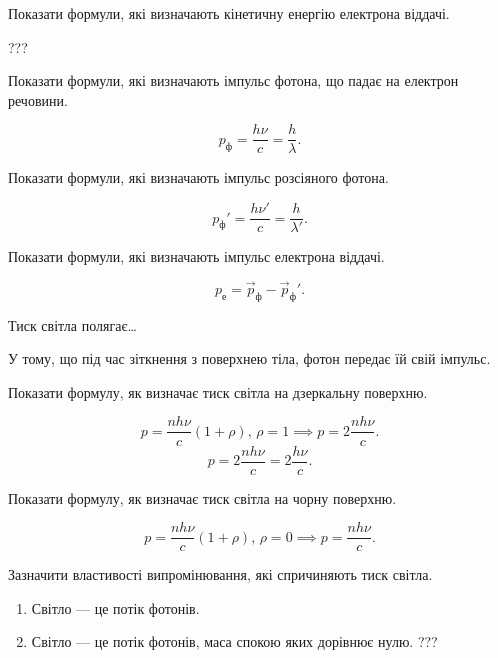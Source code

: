 \documentclass[a4paper,oneside,DIV=12,12pt]{scrartcl}
\begin{document}
	\begin{exercise}
		Показати формули, які визначають кінетичну енергію електрона віддачі.
	\end{exercise}
	\begin{solution}
		???
	\end{solution}
	
	\begin{exercise}
		Показати формули, які визначають імпульс фотона, що падає на електрон речовини.
	\end{exercise}
	\begin{solution}
		\[
			p_\text{ф} = \frac{h \nu}{c} = \frac{h}{\lambda}.
		\]
	\end{solution}
	
	\begin{exercise}
		Показати формули, які визначають імпульс розсіяного фотона.
	\end{exercise}
	\begin{solution}
		\[
			p_\text{ф}' = \frac{h \nu'}{c} = \frac{h}{\lambda'}.
		\]
	\end{solution}
	
	\begin{exercise}
		Показати формули, які визначають імпульс електрона віддачі.
	\end{exercise}
	\begin{solution}
		\[
			p_\text{е} = \vec{p}_{\text{ф}} - \vec{p}_{\text{ф}}'.
		\]
	\end{solution}
	
	\begin{exercise}
		Тиск світла полягає…
	\end{exercise}
	\begin{solution}
		У тому, що під час зіткнення з поверхнею тіла, фотон передає їй свій імпульс.
	\end{solution}
	
	\begin{exercise}
		Показати формулу, як визначає тиск світла на дзеркальну поверхню.
	\end{exercise}
	\begin{solution}
		\[
			p = \frac{n h \nu}{c} (1 + \rho), \, \rho = 1 \implies p = 2 \frac{n h \nu}{c}.
		\]
		\[
			p = 2 \frac{n h \nu}{c} = 2 \frac{h \nu}{c}.
		\]
	\end{solution}
	
	\begin{exercise}
		Показати формулу, як визначає тиск світла на чорну поверхню.
	\end{exercise}
	\begin{solution}
		\[
			p = \frac{n h \nu}{c} (1 + \rho), \, \rho = 0 \implies p = \frac{n h \nu}{c}.
		\]
	\end{solution}
	
	\begin{exercise}
		Зазначити властивості випромінювання, які спричиняють тиск світла.
	\end{exercise}
	\begin{solution}
		\begin{enumerate}
			\item Світло — це потік фотонів.
			\item Світло — це потік фотонів, маса спокою яких дорівнює нулю. ???
		\end{enumerate}
	\end{solution}
\end{document}
